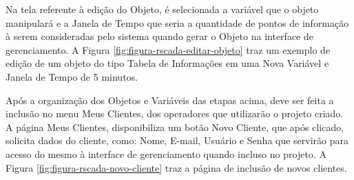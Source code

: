 Na tela referente à edição do Objeto, é selecionada a variável que o objeto manipulará e a Janela de Tempo que seria a quantidade de pontos de informação à serem consideradas pelo sistema quando gerar o Objeto na interface de gerenciamento. A Figura \ref{fig:figura-rscada-editar-objeto} traz um exemplo de edição de um objeto do tipo Tabela de Informações em uma Nova Variável e Janela de Tempo de 5 minutos.

    	
    	\begin{figure}[!h]
    	\end{figure}

Após a organização dos Objetos e Variáveis das etapas acima, deve ser feita a inclusão no menu Meus Clientes, dos operadores que utilizarão o projeto criado. A página Meus Clientes, disponibiliza um botão Novo Cliente, que após clicado, solicita dados do cliente, como: Nome, E-mail, Usuário e Senha que servirão para acesso do mesmo à interface de gerenciamento quando incluso no projeto. A Figura \ref{fig:figura-rscada-novo-cliente} traz a página de inclusão de novos clientes.

        \begin{figure}[!h]
    	\end{figure}
    	
